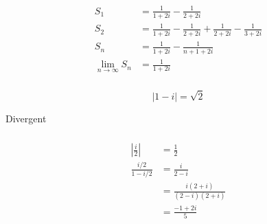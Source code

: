\documentclass{article}
\begin{document}
\begin{align*}
  S_1                             & = \frac{1}{1 + 2 i} - \frac{1}{2 + 2i}                                         \\
  S_2                             & = \frac{1}{1 + 2 i} - \frac{1}{2 + 2i} + \frac{1}{2 + 2 i} - \frac{1}{3 + 2 i} \\
  S_n                             & = \frac{1}{1 + 2 i} - \frac{1}{n + 1 + 2 i}                                    \\
  \lim_{n \rightarrow \infty} S_n & = \frac{1}{1 + 2 i}
\end{align*}

\setcounter{subsubsection}{14}
\subsubsection{}

\[|1 - i| = \sqrt{2}\]

Divergent

\setcounter{subsubsection}{16}
\subsubsection{}

\begin{align*}
  \left| \frac{i}{2} \right| & = \frac{1}{2}                       \\
  \frac{i / 2}{1 - i / 2}    & = \frac{i}{2 - i}                   \\
                             & = \frac{i (2 + i)}{(2 - i) (2 + i)} \\
                             & = \frac{-1 + 2 i}{5}
\end{align*}

\setcounter{subsubsection}{18}
\subsubsection{}
\end{document}
